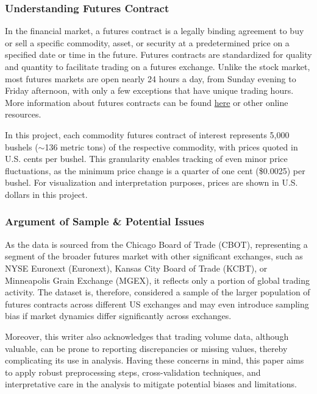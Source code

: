 \documentclass[11pt]{article}
\begin{document}
\subsubsection{Understanding Futures Contract}

In the financial market, a futures contract is a legally binding agreement to buy or sell a specific commodity, asset, or security at a predetermined price on a specified date or time in the future. Futures contracts are standardized for quality and quantity to facilitate trading on a futures exchange. Unlike the stock market, most futures markets are open nearly 24 hours a day, from Sunday evening to Friday afternoon, with only a few exceptions that have unique trading hours. More information about futures contracts can be found \href{https://www.investopedia.com/terms/f/futurescontract.asp}{here} or other online resources.

In this project, each commodity futures contract of interest represents 5,000 bushels ($\sim$136 metric tons) of the respective commodity, with prices quoted in U.S. cents per bushel. This granularity enables tracking of even minor price fluctuations, as the minimum price change is a quarter of one cent (\$0.0025) per bushel. For visualization and interpretation purposes, prices are shown in U.S. dollars in this project.

\subsubsection{Argument of Sample \& Potential Issues}

As the data is sourced from the Chicago Board of Trade (CBOT), representing a segment of the broader futures market with other significant exchanges, such as NYSE Euronext (Euronext), Kansas City Board of Trade (KCBT), or Minneapolis Grain Exchange (MGEX), it reflects only a portion of global trading activity. The dataset is, therefore, considered a sample of the larger population of futures contracts across different US exchanges and may even introduce sampling bias if market dynamics differ significantly across exchanges.

Moreover, this writer also acknowledges that trading volume data, although valuable, can be prone to reporting discrepancies or missing values, thereby complicating its use in analysis. Having these concerns in mind, this paper aims to apply robust preprocessing steps, cross-validation techniques, and interpretative care in the analysis to mitigate potential biases and limitations.
\end{document}
